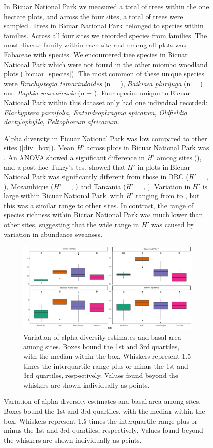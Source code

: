 \documentclass[diversity,article,submit,moreauthors,pdftex]{Definitions/mdpi}
\begin{document}
\begin{figure}[H]
In Bicuar National Park we measured a total of \nbicuartrees{} trees within the one hectare plots, and across the four sites,  a total of \ntrees{} trees were sampled. Trees in Bicuar National Park belonged to \nbicuarspecies{} species within \nbicuarfamilies{} families. Across all four sites we recorded \nspecies{} species from \nfamilies{} families. The most diverse family within each site and among all plots was Fabaceae with \nfabaceaespecies{} species. We encountered \nbicuaruniquespecies{} tree species in Bicuar National Park which were not found in the other miombo woodland plots (\autoref{bicuar_species}). The most common of these unique species were \textit{Brachystegia tamarindoides} (n = \nbg{}), \textit{Baikiaea plurijuga} (n = \nbp{}) and \textit{Baphia massaiensis} (n = \nbm{}). Four species unique to Bicuar National Park within this dataset only had one individual recorded: \textit{Elachyptera parvifolia}, \textit{Entandrophragma spicatum}, \textit{Oldfieldia dactylophylla}, \textit{Peltophorum africanum}.



Alpha diversity in Bicuar National Park was low compared to other sites (\autoref{div_box}). Mean $H'$ across plots in Bicuar National Park was \bicuarshannon{}. An ANOVA showed a significant difference in $H'$ among sites (\lmshannon{}), and a post-hoc Tukey's test showed that $H'$ in plots in Bicuar National Park was significantly different from those in DRC ($H'$ = \drcshannon{}, \tukeyshannonbicuardrc{}), Mozambique ($H'$ = \nhamshannon{}, \tukeyshannonbicuarnham{}) and Tanzania ($H'$ = \kilwashannon{}, \tukeyshannonbicuarkilwa{}). Variation in $H'$ is large within Bicuar National Park, with $H'$ ranging from \bicuarminshannon{} to \bicuarmaxshannon{}, but this was a similar range to other sites. In contrast, the range of species richness within Bicuar National Park was much lower than other sites, suggesting that the wide range in $H'$ was caused by variation in abundance evenness.

\begin{figure}[H]
\centering
	\includegraphics[width=\textwidth]{img/div_box}
	\caption{Variation of alpha diversity estimates and basal area among sites. Boxes bound the 1st and 3rd quartiles, with the median within the box. Whiskers represent 1.5 times the interquartile range plus or minus the 1st and 3rd quartiles, respectively. Values found beyond the whiskers are shown individually as points.}
    \label{div_box}
\end{figure}


\end{figure}
\end{document}
